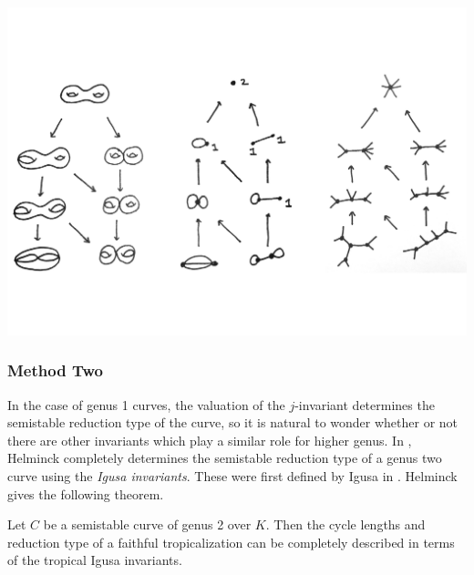 \begin{center}
  \includegraphics[width=0.9\linewidth]{../Curves/ex-2-madeline-brandt/curvestroptree}
\end{center}


\subsubsection{Method Two}

 In the case of genus 1 curves, the valuation of the $j$-invariant determines the semistable reduction type of the curve, so it is natural to wonder whether or not there are other invariants which play a similar role for higher genus. In \cite{masters}, Helminck completely determines the semistable reduction type of a genus two curve using the \emph{Igusa invariants}. These were first defined by Igusa in \cite{igusa}. Helminck gives the following theorem.

\begin{theorem}
Let $C$ be a semistable curve of genus 2 over $K$. Then the cycle lengths and reduction type of a faithful tropicalization can be completely described in terms of the tropical Igusa invariants.
\end{theorem}




